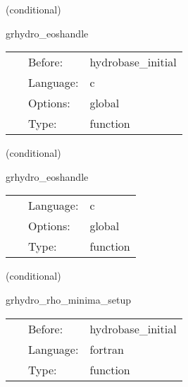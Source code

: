 \documentclass{article}
\begin{document}
\vspace{5mm}

   (conditional) 

\hspace{5mm} grhydro\_eoshandle 

\hspace{5mm}{\it set the eos number } 


\hspace{5mm}

 \begin{tabular*}{160mm}{cll} 
~ & Before:  & hydrobase\_initial \\ 
~ & Language:  & c \\ 
~ & Options:  & global \\ 
~ & Type:  & function \\ 
\end{tabular*} 


\vspace{5mm}

   (conditional) 

\hspace{5mm} grhydro\_eoshandle 

\hspace{5mm}{\it set the eos number } 


\hspace{5mm}

 \begin{tabular*}{160mm}{cll} 
~ & Language:  & c \\ 
~ & Options:  & global \\ 
~ & Type:  & function \\ 
\end{tabular*} 


\vspace{5mm}

   (conditional) 

\hspace{5mm} grhydro\_rho\_minima\_setup 

\hspace{5mm}{\it set up minimum for the rest-mass density in the atmosphere (before intial data) } 


\hspace{5mm}

 \begin{tabular*}{160mm}{cll} 
~ & Before:  & hydrobase\_initial \\ 
~ & Language:  & fortran \\ 
~ & Type:  & function \\ 
\end{tabular*} 
\end{document}
